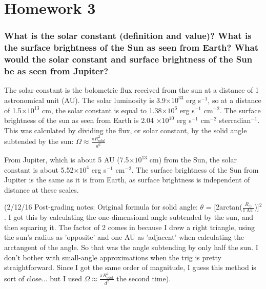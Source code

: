 \documentclass[12pt]{article}
\begin{document}


\section*{Homework 3}
\subsubsection*{What is the solar constant (definition and value)?
    What is the surface brightness of the Sun as seen from Earth?
    What would the solar constant and surface brightness of the Sun
    be as seen from Jupiter?}

    The solar constant is the bolometric flux received from the sun at a
    distance of 1 astronomical unit (AU)\cite{kuhn}.
    The solar luminosity is 3.9$\times10^{33}$ erg s$^{-1}$, so at a distance of
    1.5$\times10^{13}$ cm, the solar constant is equal to
    1.38$\times10^6$ erg s$^{-1}$ cm$^{-2}$.
    The surface brightness of the sun as seen from Earth is
    2.04 $\times10^{10}$ erg s$^{-1}$ cm$^{-2}$ sterradian$^{-1}$.
    This was calculated by dividing the flux, or solar constant, by
    the solid angle subtended by the sun:
    $ \Omega \approx \frac{\pi R_{odot}^2}{d^2} $

    From Jupiter, which is about 5 AU (7.5$\times10^{13}$ cm) from the Sun,
    the solar constant is about 5.52$\times10^4$ erg s$^{-1}$ cm$^{-2}$.
    The surface brightness of the Sun from Jupiter
    is the same as it is from Earth, as
    surface brightness is independent of distance at these scales.

    (2/12/16 Post-grading notes: 
    Original formula for solid angle:
    $\theta$ = [2arctan($\frac{R_{\odot}}{1\ \textrm{AU}}$)]$^2$.
    I got this by calculating the one-dimensional angle subtended by
    the sun, and then squaring it. The factor of 2 comes in because I
    drew a right triangle, using the sun's radius as 'opposite' and
    one AU as 'adjacent' when calculating the arctangent of the angle.
    So that was the angle subtending by only half the sun. I don't
    bother with small-angle approximations when the trig is pretty
    straightforward. Since I got the same order of magnitude, I guess
    this method is sort of close... but I used
    $ \Omega \approx \frac{\pi R_{odot}^2}{d^2} $
    the second time).


\end{document}
